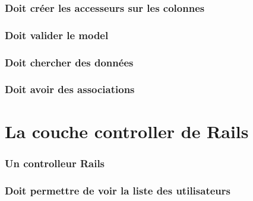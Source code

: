 \documentclass{beamer}
\begin{document}
\begin{frame}
    \frametitle{Doit cr\'eer les accesseurs sur les colonnes}
    \begin{center}
        
    \end{center}
\end{frame}

\begin{frame}
    \frametitle{Doit valider le model}
    \begin{center}
        
    \end{center}
\end{frame}

\begin{frame}
    \frametitle{Doit chercher des donn\'ees}
    \begin{center}
        
    \end{center}
\end{frame}

\begin{frame}
    \frametitle{Doit avoir des associations}
    \begin{center}
        
    \end{center}
\end{frame}

\section{La couche controller de Rails}

\begin{frame}
    \frametitle{Un controlleur Rails}
    \begin{center}
        
    \end{center}
\end{frame}

\begin{frame}
    \frametitle{Doit permettre de voir la liste des utilisateurs}
    \begin{center}
        
    \end{center}
\end{frame}
\end{document}
